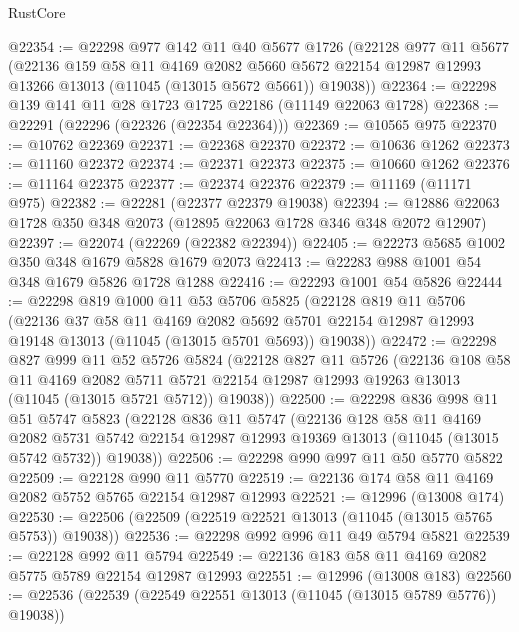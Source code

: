 \begin{lexlean}{RustCore}
\begin{coremodule}
@22354 := @22298
    @977
    @142
    @11
    @40
    @5677
    @1726
    (@22128
      @977
      @11
      @5677
      (@22136
        @159
        @58
        @11
        @4169
        @2082
        @5660
        @5672
        @22154
        @12987
        @12993
        @13266
        @13013
        (@11045 (@13015 @5672 @5661))
        @19038))
@22364 := @22298 @139 @141 @11 @28 @1723 @1725 @22186 (@11149 @22063 @1728)
@22368 := @22291 (@22296 (@22326 (@22354 @22364)))
@22369 := @10565 @975
@22370 := @10762 @22369
@22371 := @22368 @22370
@22372 := @10636 @1262
@22373 := @11160 @22372
@22374 := @22371 @22373
@22375 := @10660 @1262
@22376 := @11164 @22375
@22377 := @22374 @22376
@22379 := @11169 (@11171 @975)
@22382 := @22281 (@22377 @22379 @19038)
@22394 := @12886 @22063 @1728 @350 @348 @2073 (@12895 @22063 @1728 @346 @348 @2072 @12907)
@22397 := @22074 (@22269 (@22382 @22394))
@22405 := @22273 @5685 @1002 @350 @348 @1679 @5828 @1679 @2073
@22413 := @22283 @988 @1001 @54 @348 @1679 @5826 @1728 @1288
@22416 := @22293 @1001 @54 @5826
@22444 := @22298
    @819
    @1000
    @11
    @53
    @5706
    @5825
    (@22128
      @819
      @11
      @5706
      (@22136
        @37
        @58
        @11
        @4169
        @2082
        @5692
        @5701
        @22154
        @12987
        @12993
        @19148
        @13013
        (@11045 (@13015 @5701 @5693))
        @19038))
@22472 := @22298
    @827
    @999
    @11
    @52
    @5726
    @5824
    (@22128
      @827
      @11
      @5726
      (@22136
        @108
        @58
        @11
        @4169
        @2082
        @5711
        @5721
        @22154
        @12987
        @12993
        @19263
        @13013
        (@11045 (@13015 @5721 @5712))
        @19038))
@22500 := @22298
    @836
    @998
    @11
    @51
    @5747
    @5823
    (@22128
      @836
      @11
      @5747
      (@22136
        @128
        @58
        @11
        @4169
        @2082
        @5731
        @5742
        @22154
        @12987
        @12993
        @19369
        @13013
        (@11045 (@13015 @5742 @5732))
        @19038))
@22506 := @22298 @990 @997 @11 @50 @5770 @5822
@22509 := @22128 @990 @11 @5770
@22519 := @22136 @174 @58 @11 @4169 @2082 @5752 @5765 @22154 @12987 @12993
@22521 := @12996 (@13008 @174)
@22530 := @22506 (@22509 (@22519 @22521 @13013 (@11045 (@13015 @5765 @5753)) @19038))
@22536 := @22298 @992 @996 @11 @49 @5794 @5821
@22539 := @22128 @992 @11 @5794
@22549 := @22136 @183 @58 @11 @4169 @2082 @5775 @5789 @22154 @12987 @12993
@22551 := @12996 (@13008 @183)
@22560 := @22536 (@22539 (@22549 @22551 @13013 (@11045 (@13015 @5789 @5776)) @19038))

\end{coremodule}
\end{lexlean}
